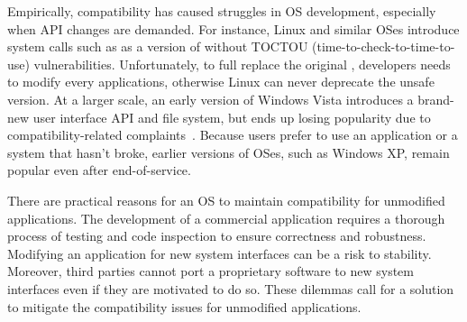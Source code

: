 Empirically, compatibility has caused struggles in OS development,
especially when API changes are demanded.
For instance, Linux and similar OSes
introduce system calls such as  as a version of 
without TOCTOU (time-to-check-to-time-to-use)
vulnerabilities.
Unfortunately,
to full replace the original , developers needs to modify every applications, otherwise Linux can never deprecate
the unsafe version.
At a larger scale, an early version of Windows Vista introduces
a brand-new user interface API
and file system,
but ends up losing popularity due to compatibility-related complaints~\cite{spolsky04microsoft-api-war}.
Because users prefer to use an application or a system
that hasn't broke,
earlier versions of OSes, such as Windows XP, remain popular even after end-of-service.


There are practical reasons
for an OS to maintain compatibility for unmodified applications.
The development of a commercial application
requires a thorough process of testing and code inspection to ensure correctness and robustness.
Modifying an application for new system interfaces can be a risk to stability.
Moreover, third parties cannot port a proprietary software to new system interfaces even if they are motivated to do so.
These dilemmas call for a solution
to mitigate 
the compatibility issues for 
unmodified applications.





